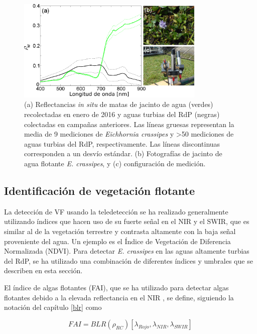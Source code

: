         \begin{figure}
        \centering
        \includegraphics[width=0.8\textwidth]{cam/figures/firmaCamalote.png}
        \caption[Reflectancias \textit{in situ} de matas de jacinto de agua y de aguas turbias del RdP]{(a) Reflectancias \textit{in situ} de matas de jacinto de agua (verdes) recolectadas en enero de 2016 y aguas turbias del RdP (negras) colectadas en campañas anteriores. Las líneas gruesas representan la media de 9 mediciones de \textit{Eichhornia crassipes} y >50 mediciones de aguas turbias del RdP, respectivamente. Las líneas discontinuas corresponden a un desvío estándar. (b) Fotografías de jacinto de agua flotante \textit{E. crassipes}, y (c) configuración de medición.}
        \label{cam:firmaCamalote}
        \end{figure}

    
    \subsection{Identificación de vegetación flotante}
    \label{cam:s:identificacion}
    
        La detección de VF usando la teledetección se ha realizado generalmente utilizando índices que hacen uso de su fuerte señal en el NIR y el SWIR, que es similar al de la vegetación terrestre y contrasta altamente con la baja señal proveniente del agua. Un ejemplo es el Índice de Vegetación de Diferencia Normalizada (NDVI). Para detectar \textit{E. crassipes} en las aguas altamente turbias del RdP, se ha utilizado una combinación de diferentes índices y umbrales que se describen en esta sección.

        El índice de algas flotantes (FAI), que se ha utilizado para detectar algas flotantes debido a la elevada reflectancia en el NIR \cite{hu2010b}, se define, siguiendo la notación del capítulo \ref{blr} como

        \begin{equation}
            FAI = BLR(\rho_{RC})[\lambda_{Rojo},\lambda_{NIR},\lambda_{SWIR}]
            \label{cam:eq:fai}
        \end{equation}
        
